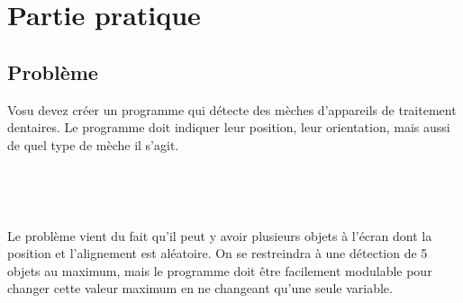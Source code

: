 \section{Partie pratique}

\subsection{Problème}
Vosu devez créer un programme qui détecte des mèches d'appareils de traitement dentaires. Le programme doit indiquer leur position, leur orientation, mais aussi de quel type de mèche il s'agit.

\vspace{0.2cm}
\noindent
\begin{minipage}[c]{\textwidth}
  \centering
  \\
  \label{fig.Input1}
\end{minipage}\\
\vspace{0.2cm}

Le problème vient du fait qu'il peut y avoir plusieurs objets à l'écran dont la position et l'alignement est aléatoire. On se restreindra à une détection de 5 objets au maximum, mais le programme doit être facilement modulable pour changer cette valeur maximum en ne changeant qu'une seule variable.

